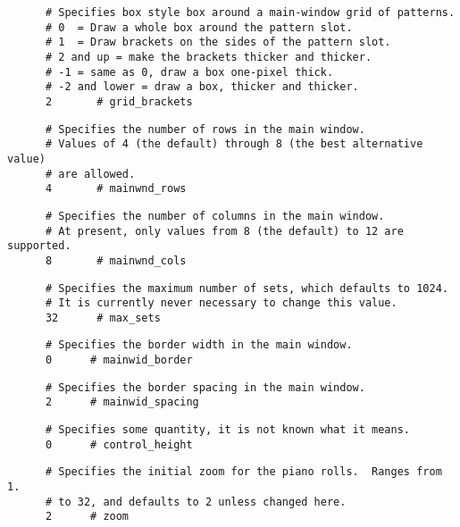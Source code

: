    \begin{verbatim}
      # Specifies box style box around a main-window grid of patterns.
      # 0  = Draw a whole box around the pattern slot.
      # 1  = Draw brackets on the sides of the pattern slot.
      # 2 and up = make the brackets thicker and thicker.
      # -1 = same as 0, draw a box one-pixel thick.
      # -2 and lower = draw a box, thicker and thicker.
      2       # grid_brackets
   \end{verbatim}

   \begin{verbatim}
      # Specifies the number of rows in the main window.
      # Values of 4 (the default) through 8 (the best alternative value)
      # are allowed.
      4       # mainwnd_rows
   \end{verbatim}

   \begin{verbatim}
      # Specifies the number of columns in the main window.
      # At present, only values from 8 (the default) to 12 are supported.
      8       # mainwnd_cols
   \end{verbatim}

   \begin{verbatim}
      # Specifies the maximum number of sets, which defaults to 1024.
      # It is currently never necessary to change this value.
      32      # max_sets
   \end{verbatim}

   \begin{verbatim}
      # Specifies the border width in the main window.
      0      # mainwid_border
   \end{verbatim}

   \begin{verbatim}
      # Specifies the border spacing in the main window.
      2      # mainwid_spacing
   \end{verbatim}

   \begin{verbatim}
      # Specifies some quantity, it is not known what it means.
      0      # control_height
   \end{verbatim}

   \begin{verbatim}
      # Specifies the initial zoom for the piano rolls.  Ranges from 1.
      # to 32, and defaults to 2 unless changed here.
      2      # zoom
   \end{verbatim}

